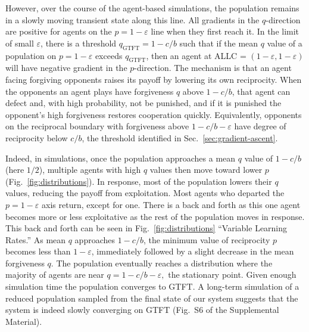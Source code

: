\documentclass[10pt]{article}
\newcommand{\eps}{\varepsilon}
\begin{document}
However, over the course of the agent-based simulations, the population remains in a slowly moving transient state along this line. All gradients in the $q$-direction are positive for agents on the $p = 1-\eps$ line when they first reach it. In the limit of small $\eps$, there is a threshold $q_{\text{GTFT}} = 1-c/b$ such that if the mean $q$ value of a population on $p = 1-\eps$ exceeds $q_{\text{GTFT}}$, then an agent at ALLC = $(1-\eps, 1-\eps)$ will have negative gradient in the $p$-direction. The mechanism is that an agent facing forgiving opponents raises its payoff by lowering its own reciprocity. When the opponents an agent plays have forgiveness $q$ above $1-c/b$, that agent can defect and, with high probability, not be punished, and if it is punished the opponent's high forgiveness restores cooperation quickly. Equivalently, opponents on the reciprocal boundary with forgiveness above $1-c/b-\eps$ have degree of reciprocity below $c/b$, the threshold identified in Sec.~\ref{sec:gradient-ascent}.

Indeed, in simulations, once the population approaches a mean $q$ value of $1-c/b$ (here $1/2$), multiple agents with high $q$ values then move toward lower $p$ (Fig.~\ref{fig:distributions}). In response, most of the population lowers their $q$ values, reducing the payoff from exploitation. Most agents who departed the $p = 1-\eps$ axis return, except for one. There is a back and forth as this one agent becomes more or less exploitative as the rest of the population moves in response. This back and forth can be seen in Fig.~\ref{fig:distributions} ``Variable Learning Rates.'' As mean $q$ approaches $1-c/b$, the minimum value of reciprocity $p$ becomes less than $1-\eps$, immediately followed by a slight decrease in the mean forgiveness $q$. The population eventually reaches a distribution where the majority of agents are near $q = 1-c/b-\eps,$ the stationary point. Given enough simulation time the population converges to GTFT. A long-term simulation of a reduced population sampled from the final state of our system suggests that the system is indeed slowly converging on GTFT (Fig.~S6 of the Supplemental Material).
\end{document}
